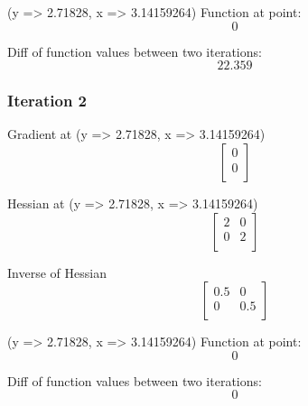 \documentclass{article}
\begin{document}
(y => 2.71828, x => 3.14159264)
Function at point:
\begin{equation}
0
\end{equation}

Diff of function values between two iterations:
\begin{equation}
22.359
\end{equation}

\subsubsection{Iteration 2}
Gradient at (y => 2.71828, x => 3.14159264)
\begin{equation}
\left[
\begin{array}{c}
0 \\
0 \\
\end{array}
\right]
\end{equation}

Hessian at (y => 2.71828, x => 3.14159264)
\begin{equation}
\left[
\begin{array}{cc}
2 & 0 \\
0 & 2 \\
\end{array}
\right]
\end{equation}

Inverse of Hessian
\begin{equation}
\left[
\begin{array}{cc}
0.5 & 0 \\
0 & 0.5 \\
\end{array}
\right]
\end{equation}

(y => 2.71828, x => 3.14159264)
Function at point:
\begin{equation}
0
\end{equation}

Diff of function values between two iterations:
\begin{equation}
0
\end{equation}
\end{document}
